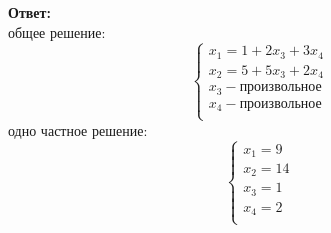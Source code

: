 \documentclass[a4paper,12pt]{article}
\begin{document}
\begin{large}
\begin{center}
\textbf{Ответ:} \\
общее решение:
\[
\begin{cases}
x_1 = 1 + 2x_3 + 3x_4\\
x_2 = 5  +5x_3 + 2x_4\\
x_3 - \text{произвольное}\\
x_4 - \text{произвольное}\\
\end{cases}
\]
одно частное решение:
\[
\begin{cases}
x_1 = 9\\
x_2 = 14\\
x_3 = 1\\
x_4 = 2\\
\end{cases}
\]
\end{center}
\end{large}
\end{document}
